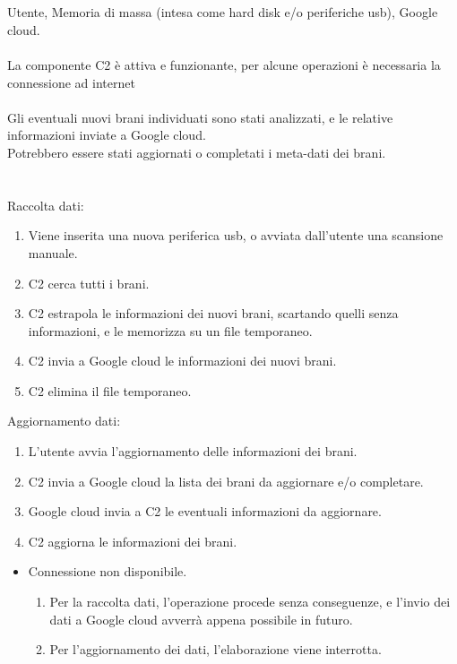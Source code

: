 \newpage
\vspace*{0.5cm}
\\\\
 Utente, Memoria di massa (intesa come hard disk e/o
periferiche usb), Google cloud. \\\\  La componente C2 \`e
attiva e funzionante, per alcune operazioni \`e necessaria la connessione ad internet \\\\
Gli eventuali nuovi brani individuati sono stati analizzati, e le relative
informazioni inviate a Google cloud.\\
Potrebbero essere stati aggiornati o completati i meta-dati dei brani. \\\\
 \\
Raccolta dati:
\begin{enumerate}
  \item Viene inserita una nuova periferica usb, o avviata dall'utente una
  scansione manuale.
  \item C2 cerca tutti i brani.
  \item C2 estrapola le informazioni dei nuovi brani, scartando quelli senza
  informazioni, e le memorizza su un file temporaneo.
  \item C2 invia a Google cloud le informazioni dei nuovi brani.
  \item C2 elimina il file temporaneo.
\end{enumerate}
Aggiornamento dati:
\begin{enumerate}
  \item L'utente avvia l'aggiornamento delle informazioni dei brani.
  \item C2 invia a Google cloud la lista dei brani da aggiornare e/o completare.
  \item Google cloud invia a C2 le eventuali informazioni da aggiornare.
  \item C2 aggiorna le informazioni dei brani.
\end{enumerate}
\begin{itemize}
  \item Connessione non disponibile.
  \begin {enumerate}
    \item Per la raccolta dati, l'operazione procede senza conseguenze, e
    l'invio dei dati a Google cloud avverr\`a appena possibile in futuro.
    \item Per l'aggiornamento dei dati, l'elaborazione viene interrotta.
  \end{enumerate}
\end{itemize}
\newpage


